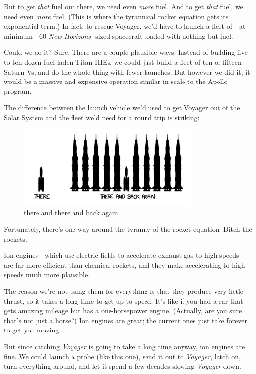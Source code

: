 {But to get \emph{that} fuel out there, we need even \emph{more} fuel. And to get \emph{that} fuel, we need even \emph{more} fuel. (This is where the tyrannical rocket equation gets its exponential term.) In fact, to rescue Voyager, we’d have to launch a fleet of—at minimum—60 \emph{New Horizons} -sized spacecraft loaded with nothing but fuel.}

{Could we do it? Sure. There are a couple plausible ways. Instead of building five to ten dozen fuel-laden Titan IIIEs, we could just build a fleet of ten or fifteen Saturn Vs, and do the whole thing with fewer launches. But however we did it, it would be a massive and expensive operation similar in scale to the Apollo program.}

{The difference between the launch vehicle we’d used to get Voyager out of the Solar System and the fleet we’d need for a round trip is striking:}

\begin{figure}[!htbp]
\centering
\includegraphics[scale=0.5, max width=0.8\textwidth]{imgs/a/38/voyager_comparison.png}
\caption{there and there and back again}
\end{figure}

{Fortunately, there’s one way around the tyranny of the rocket equation: Ditch the rockets.}

{Ion engines—which use electric fields to accelerate exhaust gas to high speeds—are far more efficient than chemical rockets, and they make accelerating to high speeds much more plausible.}

{The reason we’re not using them for everything is that they produce very little thrust, so it takes a long time to get up to speed. It’s like if you had a car that gets amazing mileage but has a one-horsepower engine. (Actually, are you sure that’s not just a horse?) Ion engines are great; the current ones just take forever to get you moving.}

{But since catching \emph{Voyager} is going to take a long time anyway, ion engines are fine. We could launch a probe (like \href{http://trs-new.jpl.nasa.gov/dspace/bitstream/2014/13644/1/00-0010.pdf}{this one}), send it out to \emph{Voyager}, latch on, turn everything around, and let it spend a few decades slowing \emph{Voyager} down.}

